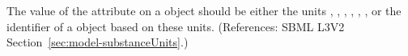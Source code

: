 The value of the attribute  on a \Model object should be
either the units , , ,
, , , or the identifier of a
\UnitDefinition object based on these units.  (References: SBML L3V2
Section~\ref{sec:model-substanceUnits}.)
